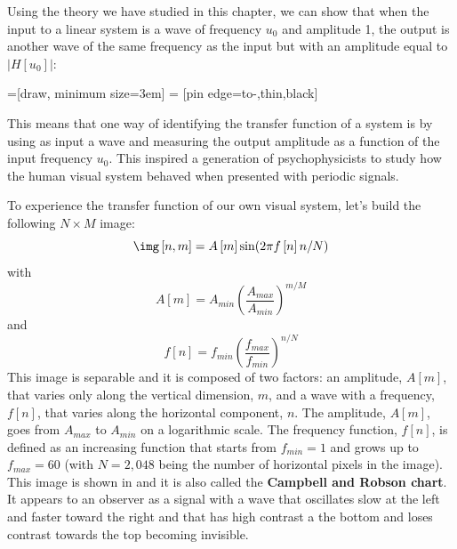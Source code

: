 Using the theory we have studied in this chapter, we can show that when the input to a linear system is a wave of frequency $u_0$ and amplitude 1, the output is another wave of the same frequency as the input but with an amplitude equal to $|H \left[ u_0 \right]|$: 

\begin{center}
=[draw, minimum size=3em]
 = [pin edge={to-,thin,black}]
\end{center}

This means that one way of identifying the transfer function of a system is by using as input a wave and measuring the output amplitude as a function of the input frequency $u_0$. This inspired a generation of psychophysicists to study how the human visual system behaved when presented with periodic signals. 


To experience the transfer function of our own visual system, let's build the following $N \times M$ image:
\begin{equation}
\img \left[n,m\right] = A\left[m\right] \sin(2 \pi f\left[n\right] n/N)
\end{equation}
with
\begin{equation}
A\left[m\right] = A_{min} \left(\frac{A_{max}}{A_{min}}\right)^{m/M}
\end{equation}
and
\begin{equation}
f\left[n\right] = f_{min} \left(\frac{f_{max}}{f_{min}}\right)^{n/N}
\end{equation}
This image is separable and it is composed of two factors: an amplitude, $A\left[m\right]$, that varies only along the vertical dimension, $m$, and a wave with a frequency, $f\left[n\right]$, that varies along the horizontal component, $n$. The amplitude, $A\left[m\right]$, goes from $A_{max}$ to $A_{min}$ on a logarithmic scale. The frequency function, $f\left[n\right]$, is defined as an increasing function that starts from $f_{min}=1$ and grows up to $f_{max}=60$ (with $N=2,048$ being the number of horizontal pixels in the image). This image is shown in \fig{\ref{fig:csfchart}} and it is also called the {\bf Campbell and Robson chart}.
It appears to an observer as a signal with a wave that oscillates slow at the left and faster toward the right and that has high contrast a the bottom and loses contrast towards the top becoming invisible.


